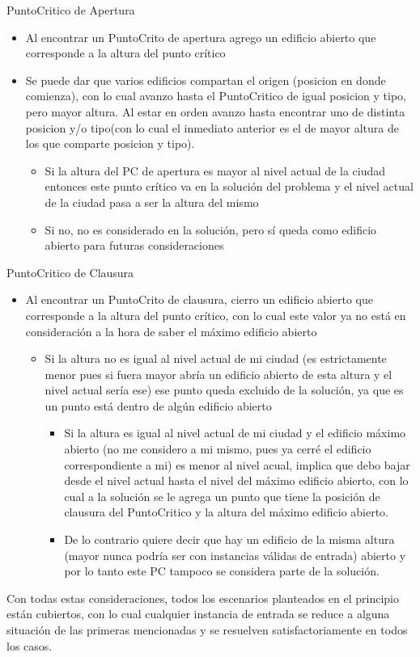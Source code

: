 PuntoCritico de Apertura
\begin{itemize}
		\item Al encontrar un PuntoCrito de apertura agrego un edificio abierto que corresponde a la altura del punto cr\'itico
		\item Se puede dar que varios edificios compartan el origen (posicion en donde comienza), con lo cual avanzo hasta el PuntoCritico de igual posicion y tipo, pero mayor altura. Al estar en orden avanzo hasta encontrar uno de distinta posicion y/o tipo(con lo cual el inmediato anterior es el de mayor altura de los que comparte posicion y tipo).
			\begin{itemize}
				\item Si la altura del PC de apertura es mayor al nivel actual de la ciudad entonces este punto cr\'itico va en la soluci\'on del problema y el nivel actual de la ciudad pasa a ser la altura del mismo
				\item Si no, no es considerado en la solución, pero s\'i queda como edificio abierto para futuras consideraciones
			\end{itemize}
\end{itemize}

PuntoCritico de Clausura
\begin{itemize}
	\item Al encontrar un PuntoCrito de clausura, cierro un edificio abierto que corresponde a la altura del punto cr\'itico, con lo cual este valor ya no está en consideración a la hora de saber el máximo edificio abierto
		\begin{itemize}
			\item Si la altura no es igual al nivel actual de mi ciudad (es estrictamente menor pues si fuera mayor abr\'ia un edificio abierto de esta altura y el nivel actual ser\'ia ese) ese punto queda excluido de la solución, ya que es un punto está dentro de algún edificio abierto
			\begin{itemize}
				\item Si la altura es igual al nivel actual de mi ciudad y el edificio máximo abierto (no me considero a mi mismo, pues ya cerr\'e el edificio correspondiente a mi) es menor al nivel acual, implica que debo bajar desde el nivel actual hasta el nivel del máximo edificio abierto, con lo cual a la solución se le agrega un punto que tiene la posición de clausura del PuntoCritico y la altura del máximo edificio abierto.
				\item De lo contrario quiere decir que hay un edificio de la misma altura (mayor nunca podría ser con instancias válidas de entrada) abierto y por lo tanto este PC tampoco se considera parte de la solución.
			\end{itemize}
		\end{itemize}
\end{itemize}

Con todas estas consideraciones, todos los escenarios planteados en el principio están cubiertos, con lo cual cualquier instancia de entrada se reduce a alguna situación de las primeras mencionadas y se resuelven satisfactoriamente en todos los casos.
